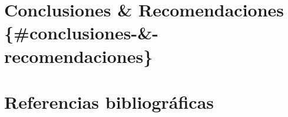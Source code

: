 \documentclass[
  a4paper,
]{article}
\begin{document}
\hypertarget{conclusiones-recomendaciones-conclusiones--recomendaciones}{%
\section{\texorpdfstring{\textbf{Conclusiones \& Recomendaciones}
\{\#conclusiones-\&-recomendaciones\}}{Conclusiones \& Recomendaciones \{\#conclusiones-\&-recomendaciones\}}}\label{conclusiones-recomendaciones-conclusiones--recomendaciones}}

\newpage

\hypertarget{referencias-bibliogruxe1ficas}{%
\section{\texorpdfstring{\textbf{Referencias
bibliográficas}}{Referencias bibliográficas}}\label{referencias-bibliogruxe1ficas}}
\end{document}
